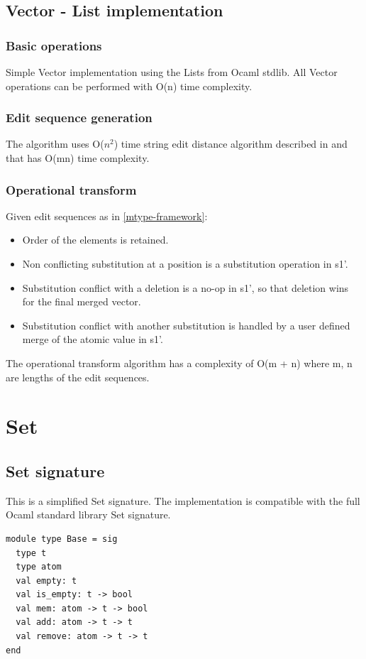 \documentclass{article}
\begin{document}
\subsection{Vector - List implementation}
\subsubsection{Basic operations}
Simple Vector implementation using the Lists from Ocaml stdlib. All Vector operations can be performed with O(n) time complexity.
\subsubsection{Edit sequence generation}
The algorithm uses O($n^{2}$) time string edit distance algorithm described in \cite{wagner-fischer-1974} and \cite{mergeable-types} that has O(mn) time complexity. 
\subsubsection{Operational transform}
Given edit sequences as in \ref{mtype-framework}: 
\begin{itemize}
\item Order of the elements is retained. 
\item Non conflicting substitution at a position is a substitution operation in s1'.
\item Substitution conflict with a deletion is a no-op in s1', so that deletion wins for the final merged vector. 
\item Substitution conflict with another substitution is handled by a user defined merge of the atomic value in s1'. 
\end{itemize}

The operational transform algorithm has a complexity of O(m + n) where m, n are lengths of the edit sequences.

\newpage
\section{Set}
\subsection{Set signature}
This is a simplified Set signature. The implementation is compatible with the full Ocaml standard library Set signature.
\begin{lstlisting}
module type Base = sig
  type t
  type atom
  val empty: t
  val is_empty: t -> bool
  val mem: atom -> t -> bool
  val add: atom -> t -> t
  val remove: atom -> t -> t
end
\end{lstlisting}
\end{document}
